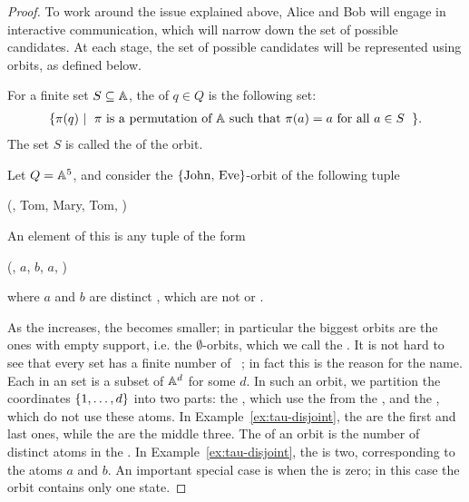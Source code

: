 \begin{proof}
To work around the issue explained above, Alice and Bob will engage in interactive communication, which will narrow down the set of possible candidates. At each stage, the set of possible candidates will be represented using orbits, as defined below.

\begin{definition}[Orbit] \label{def:orbit}
  \AP
  For a finite set $S \subseteq \mathbb A$, the  of $q \in Q$ is the following set:
    \begin{align*}
    \setbuild{ \pi(q)}{$\pi$ is a permutation of $\atoms$ such that $\pi(a)=a$ for all $a \in S$}.
    \end{align*}
  The set $S$ is called the  of the orbit.
\end{definition}

\begin{myexample}\label{ex:tau-disjoint}
    Let $Q = \mathbb A^5$, and consider the $\{\text{{John}, {Eve}}\}$-orbit of the following tuple
    \begin{center}
        (, Tom, Mary, Tom, )
    \end{center}
    An element of this  is any tuple of the form 
    \begin{center}
        (, $a$, $b$, $a$, )
    \end{center}
    where $a$ and $b$ are distinct , which are not  or . 
\end{myexample}

\AP As the  increases, the  becomes smaller; in
particular the biggest orbits are the ones with empty support, i.e. the
$\emptyset$-orbits, which we call the . It is not
hard to see that every  set has a finite number of
~\cite[Lemma 1.4]{bojanczyk_slightly}; in fact this is
the reason for the name. Each  in an  set is a
subset of $\mathbb A^d$ for some $d$. In such an orbit, we partition the
coordinates $\{1,\ldots,d\}$ into two parts: the ,
which use the  from the , and the , which do not use these atoms. In Example~\ref{ex:tau-disjoint},
the  are  the first and last ones, while the  are the middle three. The  of an
orbit is the number of distinct atoms in the . In
Example~\ref{ex:tau-disjoint}, the  is two,
corresponding to the atoms $a$ and $b$. An important special case is when the
 is zero; in this case the orbit contains only one state.


\end{proof}
